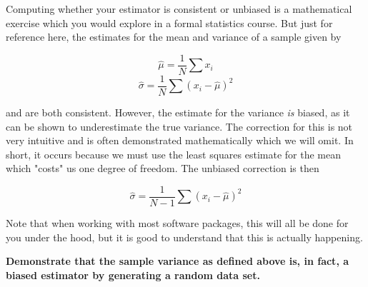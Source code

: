 \documentclass[11pt]{article}
\begin{document}
Computing whether your estimator is consistent or unbiased is a
mathematical exercise which you would explore in a formal statistics
course. But just for reference here, the estimates for the mean and
variance of a sample given by

\[\hat{\mu} = \frac{1}{N}\sum{x_i}\]
\[\hat{\sigma} = \frac{1}{N}\sum{(x_i - \hat{\mu})^2}\]

and are both consistent. However, the estimate for the variance
\emph{is} biased, as it can be shown to underestimate the true variance.
The correction for this is not very intuitive and is often demonstrated
mathematically which we will omit. In short, it occurs because we must
use the least squares estimate for the mean which "costs" us one degree
of freedom. The unbiased correction is then

\[\hat{\sigma} = \frac{1}{N - 1}\sum{(x_i - \hat{\mu})^2}\]

Note that when working with most software packages, this will all be
done for you under the hood, but it is good to understand that this is
actually happening.

    \textbf{Demonstrate that the sample variance as defined above is, in
fact, a biased estimator by generating a random data set.}
\end{document}
